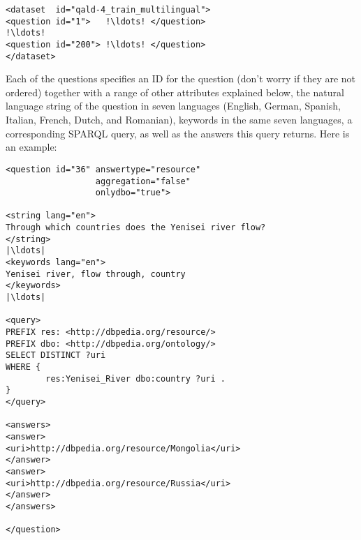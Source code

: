 \begin{lstlisting}[escapechar=!]
<dataset  id="qald-4_train_multilingual">
<question id="1">   !\ldots! </question>
!\ldots!
<question id="200"> !\ldots! </question>
</dataset>
\end{lstlisting}

Each of the questions specifies an ID for the question (don't worry if they are not ordered) together with 
a range of other attributes explained below, the natural language string of the question in seven languages 
(English, German, Spanish, Italian, French, Dutch, and Romanian), keywords in the same seven languages,
a corresponding SPARQL query, as well as the answers this query returns. Here is an example:

\begin{lstlisting}[escapechar=|]
<question id="36" answertype="resource" 
                  aggregation="false" 
                  onlydbo="true">

<string lang="en">
Through which countries does the Yenisei river flow?
</string>
|\ldots|
<keywords lang="en">
Yenisei river, flow through, country
</keywords>
|\ldots|

<query>
PREFIX res: <http://dbpedia.org/resource/>
PREFIX dbo: <http://dbpedia.org/ontology/>
SELECT DISTINCT ?uri 
WHERE {
        res:Yenisei_River dbo:country ?uri .
}
</query>

<answers>
<answer>
<uri>http://dbpedia.org/resource/Mongolia</uri>
</answer>
<answer>
<uri>http://dbpedia.org/resource/Russia</uri>
</answer>
</answers>

</question>
\end{lstlisting}

